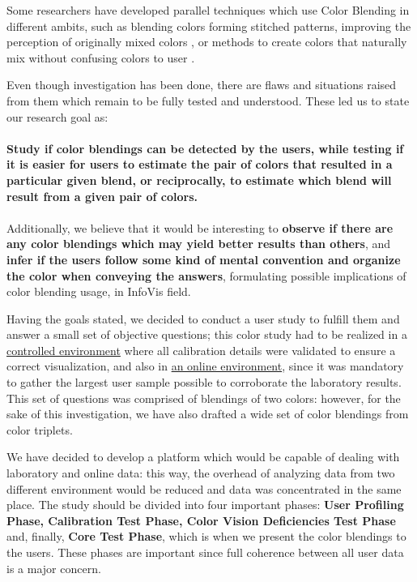 %
Some researchers have developed parallel techniques which use Color Blending in different
ambits, such as blending colors forming stitched patterns, improving the perception of originally mixed
colors \cite{Urness2003}, or methods to create colors that naturally mix without confusing colors to user \cite{Chuang2009}. \par
%
Even though investigation has been done, there are flaws and situations raised from them which remain to be fully
tested and understood. These led us to state our research goal as: \\ \\
%
\textbf{Study if color blendings can be detected by the users, while testing if it is easier for
users to estimate the pair of colors that resulted in a particular given blend, or reciprocally, to estimate
which blend will result from a given pair of colors.} \\ \\
%
Additionally, we believe that it would be interesting to \textbf{observe if there are any color blendings which
may yield better results than others}, and \textbf{infer if the users follow some kind of mental convention and
organize the color when conveying the answers}, formulating possible implications of color blending usage, in
InfoVis field. \par
%
Having the goals stated, we decided to conduct a user study to fulfill them and answer a small set of objective
questions; this color study had to be realized in a \ul{controlled environment} where all calibration
details were validated to ensure a correct visualization, and also in \ul{an online environment}, since it
was mandatory to gather the largest user sample possible to corroborate the laboratory results. This set of questions
was comprised of blendings of two colors: however, for the sake of this investigation, we have also drafted a wide set
of color blendings from color triplets.\par
%
We have decided to develop a platform which would be capable of dealing with laboratory and online data: this way,
the overhead of analyzing data from two different environment would be reduced and data was concentrated in the same
place. The study should be divided into four important phases: \textbf{User Profiling Phase, Calibration Test Phase,
Color Vision Deficiencies Test Phase} and, finally, \textbf{Core Test Phase}, which is when we present the color
blendings to the users. These phases are important since full coherence between all user data is a major concern. \par
